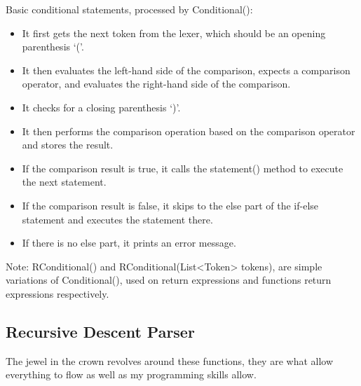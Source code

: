 \newpage
Basic conditional statements, processed by Conditional{()}:
\begin{itemize}
    \item It first gets the next token from the lexer, which should be an opening parenthesis `('.
    \item It then evaluates the left-hand side of the comparison, expects a comparison operator, and evaluates the right-hand side of the comparison.
    \item It checks for a closing parenthesis `)'.
    \item It then performs the comparison operation based on the comparison operator and stores the result.
    \item If the comparison result is true, it calls the statement{()} method to execute the next statement.
    \item If the comparison result is false, it skips to the else part of the if-else statement and executes the statement there.
    \item If there is no else part, it prints an error message.
\end{itemize}
Note: RConditional{()} and RConditional{(List<Token> tokens)}, are simple variations of Conditional{()}, used on return expressions and functions return expressions respectively. 

\subsection{Recursive Descent Parser}
The jewel in the crown revolves around these functions, they are what allow everything to flow as well as my programming skills allow.

